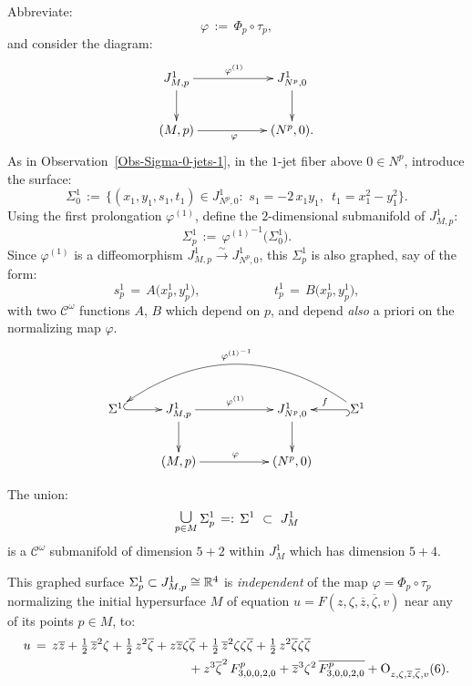 \documentclass[12pt,twoside,leqno,openany]{amsart}
\begin{document}
Abbreviate:
\[
\varphi
\,:=\,
\Phi_p\circ\tau_p,
\]
and consider the diagram:
\[
\xymatrix{
J_{M,p}^1
\ar[rr]^{\varphi^{(1)}}
\ar[d]
&
&
J_{N^p,0}^1
\ar[d]
\\
(M,p)
\ar[rr]_\varphi
&
&
(N^p,0).
}
\]
As in Observation~{\ref{Obs-Sigma-0-jets-1}},
in the $1$-jet fiber above $0 \in N^p$,
introduce the surface:
\[
\Sigma_0^1
\,:=\,
\big\{
(x_1,y_1,s_1,t_1)
\in
J_{N^p,0}^1
\colon\,\,
s_1
=
-2\,x_1y_1,\,\,\,
t_1
=
x_1^2-y_1^2
\big\}.
\]
Using the first prolongation $\varphi^{(1)}$, define the
$2$-dimensional submanifold of $J_{M,p}^1$:
\[
\Sigma_p^1
\,:=\,
{\varphi^{(1)}}^{-1}
\big(
\Sigma_0^1
\big).
\]
Since $\varphi^{(1)}$ is a diffeomorphism $J_{M,p}^1 
\overset{\sim}{\longrightarrow} J_{N^p,0}^1$,
this $\Sigma_p^1$ is also graphed, say of the form:
\[
s_p^1
\,=\,
A\big(x_p^1,y_p^1\big),
\ \ \ \ \ \ \ \ \ \ \ \ \ \ \ \ \ \ \ \ \ \ \ \ \ \
t_p^1
\,=\,
B\big(x_p^1,y_p^1\big),
\]
with two $\mathcal{C}^\omega$ functions 
$A$, $B$ which depend on $p$, and depend {\em also}
a priori on the normalizing map $\varphi$.
\[
\xymatrix{
\Sigma^1
\ar@{^{(}->}[r]
&
J_{M,p}^1
\ar[rr]^{\varphi^{(1)}}
\ar[d]
& &
J_{N^p,0}^1
\ar[d]
&
\ar@{^{(}->}[l]_f
\Sigma^1
\ar@/_3pc/[llll]_{{\varphi^{(1)}}^{-1}}
\\
&
(M,p)
\ar[rr]^{\varphi}
& &
(N^p,0)
&
}
\]

The union:
\[
\underset{p\in M}{\medcup}\,
\Sigma_p^1
\,=:\,
\Sigma^1
\,\,\subset\,\,
J_M^1
\]
is a $\mathcal{C}^\omega$ submanifold of dimension $5 + 2$ within
$J_M^1$ which has dimension $5 + 4$.

\begin{Assertion}
This graphed surface $\Sigma_p^1 \subset J_{M,p}^1 
\cong \mathbb{R}^4$ is {\em independent} of the map
$\varphi = \Phi_p \circ \tau_p$ normalizing the initial
hypersurface $M$
of equation $u = F(z, \zeta, \overline{z}, \overline{\zeta}, v)$
near any of its points $p \in M$, to:
\[
\aligned
u
&
\,=\,
z\overline{z}
+
\tfrac{1}{2}\,\overline{z}^2\zeta
+
\tfrac{1}{2}\,z^2\overline{\zeta}
+
z\overline{z}\zeta\overline{\zeta}
+
\tfrac{1}{2}\,\overline{z}^2\zeta\zeta\overline{\zeta}
+
\tfrac{1}{2}\,z^2\overline{\zeta}\zeta\overline{\zeta}
\\
&
\ \ \ \ \ \ \ \ \ \ \
\ \ \ \ \ \ \ \ \ \ \ \ \ \ \ \ \ \ \ \ \ \ \ \ \ \
+
z^3\overline{\zeta}^2\,F_{3,0,0,2,0}^p
+
\overline{z}^3\zeta^2\,\overline{F_{3,0,0,2,0}^p}
+
{\rm O}_{z,\zeta,\overline{z},\overline{\zeta},v}(6).
\endaligned
\]
\end{Assertion}
\end{document}
